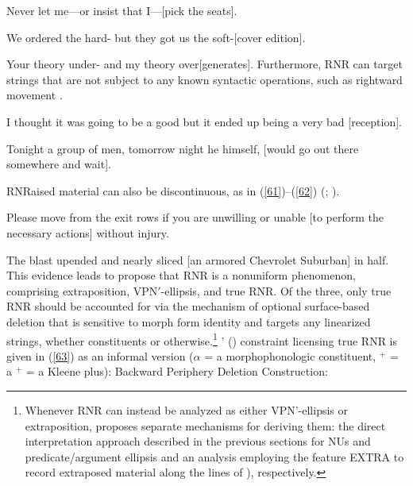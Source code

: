 \documentclass[output=paper
	        ,collection
	        ,collectionchapter
 	        ,biblatex
                ,babelshorthands
                ,newtxmath
                ,draftmode
                ,colorlinks, citecolor=brown
]{langscibook}
\begin{document}
{\ea Never let me---or insist that I---[pick the seats].\label{55}\z

\ea We ordered the hard- but they got us the soft-[cover edition].\label{56}\z

\ea Your theory under- and my theory over[generates].\label{57}\z
%
Furthermore, RNR can target strings that are not subject to any known syntactic operations, such as rightward movement \citep[865]{Chaves2014}.

\ea I thought it was going to be a good but it ended up being a very bad [reception].\label{58}\z

\ea Tonight a group of men, tomorrow night he himself, [would go out there somewhere and wait].\label{59}\z

RNRaised material can also be discontinuous, as in (\ref{61})--(\ref{62}) (\citealt[868]{Chaves2014}; \citealt[238--240]{Whitman2009}).

\ea Please move from the exit rows if you are unwilling or unable [to perform the necessary actions] without injury.\label{61}\z

\ea The blast upended and nearly sliced [an armored Chevrolet Suburban] in half.\label{62}\z
%
This evidence leads \citet{Chaves2014} to propose that RNR is a nonuniform phenomenon, comprising extraposition,  VP\/N$'$-ellipsis, and true RNR.
%
%
%
Of the three, only true RNR should be accounted for via the mechanism of optional surface-based deletion that is sensitive to morph form identity and targets any linearized strings, whether constituents or otherwise.\footnote{Whenever RNR can instead be analyzed as either VP\/N'-ellipsis or extraposition, \citeauthor{Chaves2014} proposes separate mechanisms for deriving them: the direct interpretation approach described in the previous sections for NUs and predicate/argument ellipsis and an analysis employing the feature EXTRA to record extraposed material along the lines of \citeauthor{KimSag2005, Kay2012}), respectively.} \citeauthor{Chaves2014}' (\citeyear[874]{Chaves2014}) constraint licensing true RNR is given in (\ref{63}) as an informal version  ($\alpha$
= a morphophonologic constituent, $^{+}$ = a
 $^{+}$ = a Kleene plus):
%
%
%
%
\ea
\label{63}
 Backward Periphery Deletion Construction:\\

}
\end{document}
